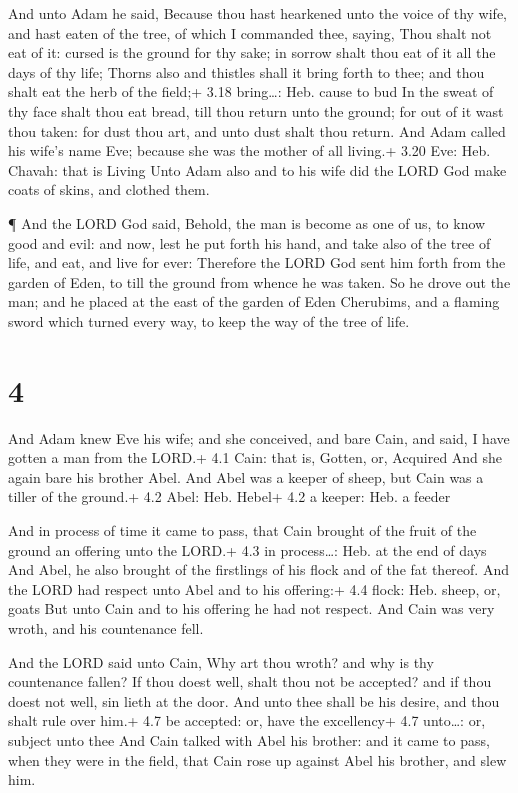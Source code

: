  And unto Adam he said, Because thou hast hearkened unto
the voice of thy wife, and hast eaten of the tree, of which I commanded
thee, saying, Thou shalt not eat of it: cursed is the ground for thy
sake; in sorrow shalt thou eat of it all the days of thy life;
 Thorns also and thistles shall it bring forth to thee; and
thou shalt eat the herb of the field;+ 3.18 bring\ldots: Heb. cause to
bud  In the sweat of thy face shalt thou eat bread, till
thou return unto the ground; for out of it wast thou taken: for dust
thou art, and unto dust shalt thou return.  And Adam called
his wife's name Eve; because she was the mother of all living.+ 3.20
Eve: Heb. Chavah: that is Living  Unto Adam also and to his
wife did the LORD God make coats of skins, and clothed them.

 ¶ And the LORD God said, Behold, the man is become as one
of us, to know good and evil: and now, lest he put forth his hand, and
take also of the tree of life, and eat, and live for ever: 
Therefore the LORD God sent him forth from the garden of Eden, to till
the ground from whence he was taken.  So he drove out the
man; and he placed at the east of the garden of Eden Cherubims, and a
flaming sword which turned every way, to keep the way of the tree of
life.

\hypertarget{section-3}{%
\section{4}\label{section-3}}

 And Adam knew Eve his wife; and she conceived, and bare
Cain, and said, I have gotten a man from the LORD.+ 4.1 Cain: that is,
Gotten, or, Acquired  And she again bare his brother Abel.
And Abel was a keeper of sheep, but Cain was a tiller of the ground.+
4.2 Abel: Heb. Hebel+ 4.2 a keeper: Heb. a feeder

 And in process of time it came to pass, that Cain brought
of the fruit of the ground an offering unto the LORD.+ 4.3 in
process\ldots: Heb. at the end of days  And Abel, he also
brought of the firstlings of his flock and of the fat thereof. And the
LORD had respect unto Abel and to his offering:+ 4.4 flock: Heb. sheep,
or, goats  But unto Cain and to his offering he had not
respect. And Cain was very wroth, and his countenance fell.

 And the LORD said unto Cain, Why art thou wroth? and why is
thy countenance fallen?  If thou doest well, shalt thou not
be accepted? and if thou doest not well, sin lieth at the door. And unto
thee shall be his desire, and thou shalt rule over him.+ 4.7 be
accepted: or, have the excellency+ 4.7 unto\ldots: or, subject unto thee
 And Cain talked with Abel his brother: and it came to pass,
when they were in the field, that Cain rose up against Abel his brother,
and slew him.

